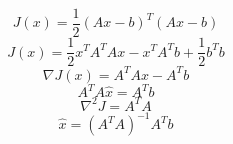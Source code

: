 \documentclass{article}
\begin{document}
\[
J(x)=\frac{1}{2}(Ax-b)^T(Ax-b)
\]
\[
J(x)=\frac{1}{2}x^TA^TAx-x^TA^Tb+\frac{1}{2}b^Tb
\]
\[
\nabla J(x)=A^TAx-A^Tb
\]
\[
A^TA\hat{x}=A^Tb
\]
\[
\nabla^2J=A^TA
\]
\[
\hat{x}=(A^TA)^{-1}A^Tb
\]
\end{document}
